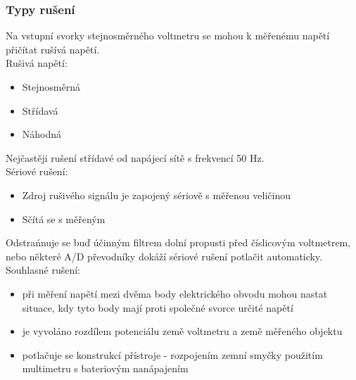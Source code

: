 \subsubsection*{Typy rušení}
Na vstupní svorky stejnosměrného voltmetru se mohou k měřenému napětí přičítat rušívá napětí.\\
Rušivá napětí:
\begin{itemize}
    \item Stejnosměrná
    \item Střídavá
    \item Náhodná
\end{itemize}
Nejčastěji rušení střídavé od napájecí sítě s frekvencí 50 Hz.\\
\newpage
Sériové rušení:
\begin{itemize}
    \item Zdroj rušivého signálu je zapojený sériově s měřenou veličinou
    \item Sčítá se s měřeným
\end{itemize}
Odstrańnuje se buď účinným filtrem dolní propusti před číslicovým voltmetrem, nebo některé A/D převodníky dokáží sériové rušení potlačit automaticky.\\
Souhlasné rušení:
\begin{itemize}
    \item při měření napětí mezi dvěma body elektrického obvodu mohou nastat situace, kdy tyto body mají proti společné svorce určité napětí
    \item je vyvoláno rozdílem potenciálu země voltmetru a země měřeného objektu
    \item potlačuje se konstrukcí přístroje - rozpojením zemní smyčky použitím multimetru s bateriovým nanápajením
\end{itemize}

